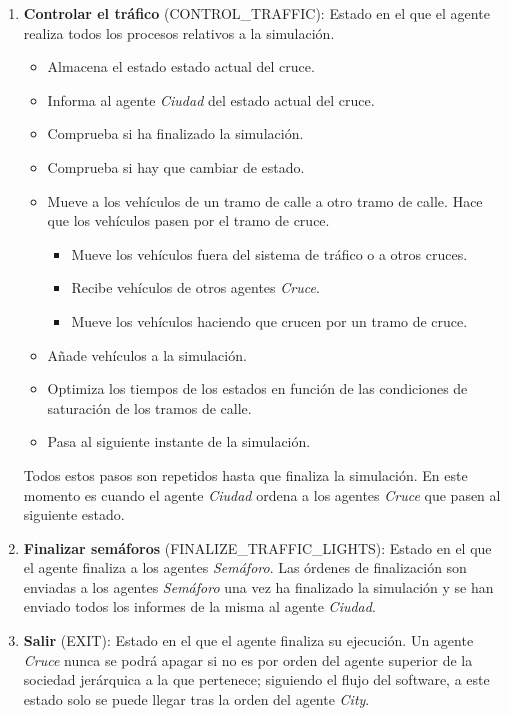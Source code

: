 \begin{enumerate}
    \item \textbf{Controlar el tráfico} \footnotesize(CONTROL\_TRAFFIC)\normalsize: Estado en el que el agente realiza todos los procesos relativos a la simulación.
    \begin{itemize}
        \item Almacena el estado estado actual del cruce.
        \item Informa al agente \textit{Ciudad} del estado actual del cruce.
        \item Comprueba si ha finalizado la simulación.
        \item Comprueba si hay que cambiar de estado.
        \item Mueve a los vehículos de un tramo de calle a otro tramo de calle. Hace que los vehículos pasen por el tramo de cruce.
        \begin{itemize}
            \item Mueve los vehículos fuera del sistema de tráfico o a otros cruces.
            \item Recibe vehículos de otros agentes \textit{Cruce}.
            \item Mueve los vehículos haciendo que crucen por un tramo de cruce.
        \end{itemize}
        \item Añade vehículos a la simulación.
        \item Optimiza los tiempos de los estados en función de las condiciones de saturación de los tramos de calle.
        \item Pasa al siguiente instante de la simulación.
    \end{itemize}
    Todos estos pasos son repetidos hasta que finaliza la simulación. En este momento es cuando el agente \textit{Ciudad} ordena a los agentes \textit{Cruce} que pasen al siguiente estado.
    \item \textbf{Finalizar semáforos} \footnotesize(FINALIZE\_TRAFFIC\_LIGHTS)\normalsize: Estado en el que el agente finaliza a los agentes \textit{Semáforo}. Las órdenes de finalización son enviadas a los agentes \textit{Semáforo} una vez ha finalizado la simulación y se han enviado todos los informes de la misma al agente \textit{Ciudad}.
    \item \textbf{Salir} \footnotesize(EXIT)\normalsize: Estado en el que el agente finaliza su ejecución. Un agente \textit{Cruce} nunca se podrá apagar si no es por orden del agente superior de la sociedad jerárquica a la que pertenece; siguiendo el flujo del software, a este estado solo se puede llegar tras la orden del agente \textit{City}.
\end{enumerate}

